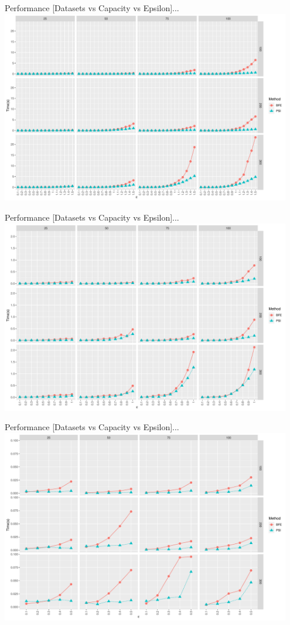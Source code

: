 \documentclass{beamer}
\begin{document}
\begin{frame}{Performance [Datasets vs Capacity vs Epsilon]...}
    \centering
    \includegraphics[width=0.95\textwidth]{scripts/uniform_benchmark_lt15}
\end{frame}

\begin{frame}{Performance [Datasets vs Capacity vs Epsilon]...}
    \centering
    \includegraphics[width=0.95\textwidth]{scripts/uniform_benchmark_lt10}
\end{frame}

\begin{frame}{Performance [Datasets vs Capacity vs Epsilon]...}
    \centering
    \includegraphics[width=0.95\textwidth]{scripts/uniform_benchmark_lt05}
\end{frame}
\end{document}
